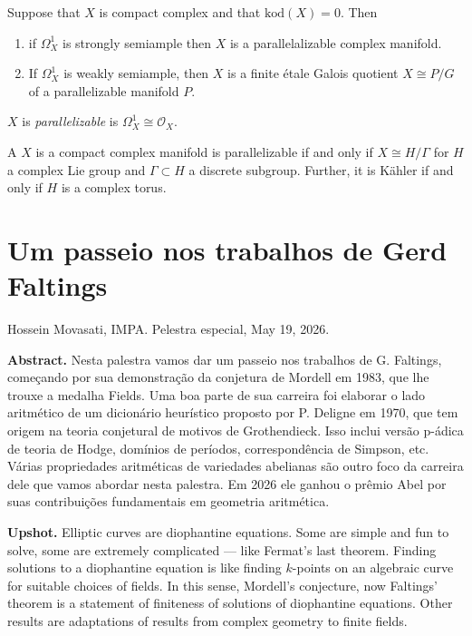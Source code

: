 \begin{theorem}[E-M]
\label{theorem-em}
Suppose that $X$ is compact complex and that
$\text{kod}(X)=0$. Then
\begin{enumerate}
\item if $\Omega_X^1$ is strongly semiample
then
$X$ is a parallelalizable complex manifold.
\item If $\Omega_X^1$ is weakly semiample,
then $X$ is a finite étale Galois quotient
$X\cong P/G$
of a parallelizable manifold $P$.
\end{enumerate}
\end{theorem}

\begin{definition}
\label{definition-paralellizable}
$X$ is {\it parallelizable} is
$\Omega_X^1\cong\mathcal{O}_X$.
\end{definition}

\noindent
A $X$ is a compact complex manifold is
parallelizable if and only if
$X \cong H/\Gamma$ for $H$ a complex Lie
group and $\Gamma\subset H$
a discrete subgroup.
Further, it is Kähler if and only if $H$ is a
complex torus.

\section{Um passeio nos trabalhos de
Gerd Faltings}
\label{section-faltings}

\noindent
Hossein Movasati, IMPA.
Pelestra especial,
May 19, 2026.

\medskip\noindent
{\bf Abstract.}
Nesta palestra vamos dar um passeio nos
trabalhos de G. Faltings, começando por sua
demonstração da conjetura de Mordell em
1983, que lhe trouxe a medalha Fields. Uma
boa parte de sua carreira foi elaborar o
lado aritmético de um dicionário heurístico
proposto por P. Deligne em 1970, que tem
origem na teoria conjetural de motivos de
Grothendieck. Isso inclui versão p-ádica de
teoria de Hodge, domínios de períodos,
correspondência de Simpson, etc. Várias
propriedades aritméticas de variedades
abelianas são outro foco da carreira dele
que vamos abordar nesta palestra. Em 2026
ele ganhou o prêmio Abel por suas
contribuições fundamentais em geometria
aritmética.

\medskip\noindent
{\bf Upshot.} 
Elliptic curves are diophantine equations.
Some are simple and fun to solve,
some are extremely complicated ---
like Fermat's last theorem.
Finding solutions to a diophantine
equation is like finding $k$-points
on an algebraic curve for suitable
choices of fields.
In this sense,
Mordell's conjecture, now Faltings'
theorem is a statement of finiteness
of solutions of diophantine equations.
Other results are adaptations
of results from complex geometry
to finite fields.

